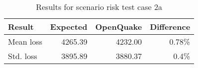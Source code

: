 \begin{table}[htbp]

\centering
\begin{tabular}{ l r r r }

\hline
\rowcolor{anti-flashwhite}
\bf{Result} & \bf{Expected} & \bf{OpenQuake} & \bf{Difference}\\
\hline
Mean loss & 4265.39 & 4232.00 & 0.78\% \\
Std. loss & 3895.89 & 3880.37 & 0.4\% \\
\hline
\end{tabular}

\caption{Results for scenario risk test case 2a}
\label{tab:result-scenario-risk-2a}
\end{table}